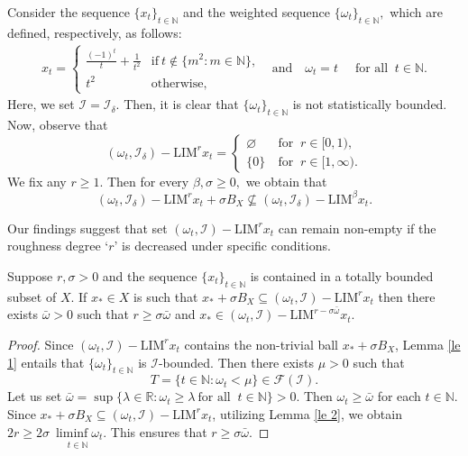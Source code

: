 \documentclass[reqno]{amsart}
\begin{document}
{\begin{example}
 Consider the sequence  $\{x_t\}_{t\in\mathbb{N}}$ and the weighted sequence $\{\omega_t\}_{t\in\mathbb{N}},$ which are  defined, respectively, as follows:
	\begin{align*}
		x_{t}=
		\begin{cases}
			\frac{(-1)^t}{t} + \frac{1}{t^2} &\mbox{if}~ t\notin \{m^2:m\in\mathbb{N}\},\\
			t^2&\text{otherwise,} 
		\end{cases}
		~~\text{ and }~~~
		\omega_{t}=
		t&~\mbox{ for all }~t\in \mathbb{N}. 
\end{align*}
Here, we  set $\mathcal{I}=\mathcal{I}_{\delta}$. Then, 
it is clear that $\{\omega_t\}_{t\in\mathbb{N}}$ is not statistically bounded. 
Now, observe that
$$(\omega_t,\mathcal{I}_\delta)-\text{LIM}^{r}x_t=
\begin{cases}
	\varnothing&~\mbox{for }~r\in[0,1), \\ 
	\{0\}&~\mbox{for }~ r\in[1,\infty).
\end{cases}$$ 
We fix any $r\geq 1$. Then for every $\beta,\sigma\geq0,$ we obtain that
$$(\omega_t,\mathcal{I}_\delta)-\text{LIM}^{r}x_t + \sigma B_X \nsubseteq (\omega_t,\mathcal{I}_\delta)-\text{LIM}^{\beta} x_t.$$
\end{example}

Our findings suggest that set $(\omega_t, \mathcal{I})-\text{LIM}^r x_t$ can remain non-empty if the roughness degree `$r$' is decreased under specific conditions.


\begin{theorem}\label{Th 2.1}
	Suppose $r,\sigma> 0$ and the sequence $\{x_t\}_{t\in\mathbb{N}}$ is contained in a totally bounded subset of $X$.  If $x_*\in X$ is such that $x_*+\sigma B_ X\subseteq (\omega_t,\mathcal{I})-\text{LIM}^{r} x_t$ then there exists $\bar\omega>0$ such that $r\geq\sigma\bar\omega$ and  $x_*\in (\omega_t,\mathcal{I})-\text{LIM}^{r-\sigma\bar\omega} x_t$. 
\end{theorem}
\begin{proof} Since $(\omega_t, \mathcal{I})-\text{LIM}^r x_t$ contains the non-trivial ball $x_*+\sigma B_ X$, Lemma \ref{le 1} entails that $\{\omega_t\}_{t\in\mathbb{N}}$ is $\mathcal{I}$-bounded. Then there exists $\mu>0$ such that 
	$$
	T=\{t\in\mathbb{N}: \omega_t<\mu\}\in\mathcal{F}(\mathcal{I}).
	$$ 
Let us set $\bar\omega=\sup\{\lambda\in\mathbb{R}:\omega_t\geq \lambda ~ \mbox{for all }~ t\in\mathbb{N}\}>0.$ Then $\omega_t\geq \bar{\omega}$ for each $t\in\mathbb{N}$. Since $x_*+\sigma B_ X\subseteq (\omega_t, \mathcal{I})-\text{LIM}^r x_t$, utilizing Lemma \ref{le 2}, we obtain  $2r\geq 2\sigma~\underset{t\in \mathbb{N}}{\liminf \omega_{t}}$. This ensures that $r\geq \sigma \bar\omega.$



\end{proof}}
\end{document}
